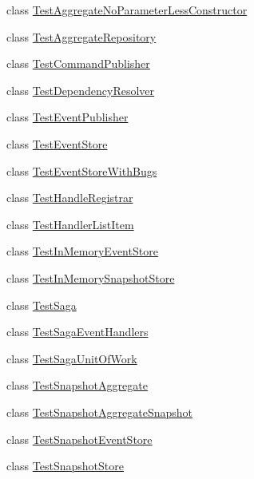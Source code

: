 \begin{DoxyCompactItemize}
class \hyperlink{classCqrs_1_1Tests_1_1Substitutes_1_1TestAggregateNoParameterLessConstructor}{Test\+Aggregate\+No\+Parameter\+Less\+Constructor}
\item 
class \hyperlink{classCqrs_1_1Tests_1_1Substitutes_1_1TestAggregateRepository}{Test\+Aggregate\+Repository}
\item 
class \hyperlink{classCqrs_1_1Tests_1_1Substitutes_1_1TestCommandPublisher}{Test\+Command\+Publisher}
\item 
class \hyperlink{classCqrs_1_1Tests_1_1Substitutes_1_1TestDependencyResolver}{Test\+Dependency\+Resolver}
\item 
class \hyperlink{classCqrs_1_1Tests_1_1Substitutes_1_1TestEventPublisher}{Test\+Event\+Publisher}
\item 
class \hyperlink{classCqrs_1_1Tests_1_1Substitutes_1_1TestEventStore}{Test\+Event\+Store}
\item 
class \hyperlink{classCqrs_1_1Tests_1_1Substitutes_1_1TestEventStoreWithBugs}{Test\+Event\+Store\+With\+Bugs}
\item 
class \hyperlink{classCqrs_1_1Tests_1_1Substitutes_1_1TestHandleRegistrar}{Test\+Handle\+Registrar}
\item 
class \hyperlink{classCqrs_1_1Tests_1_1Substitutes_1_1TestHandlerListItem}{Test\+Handler\+List\+Item}
\item 
class \hyperlink{classCqrs_1_1Tests_1_1Substitutes_1_1TestInMemoryEventStore}{Test\+In\+Memory\+Event\+Store}
\item 
class \hyperlink{classCqrs_1_1Tests_1_1Substitutes_1_1TestInMemorySnapshotStore}{Test\+In\+Memory\+Snapshot\+Store}
\item 
class \hyperlink{classCqrs_1_1Tests_1_1Substitutes_1_1TestSaga}{Test\+Saga}
\item 
class \hyperlink{classCqrs_1_1Tests_1_1Substitutes_1_1TestSagaEventHandlers}{Test\+Saga\+Event\+Handlers}
\item 
class \hyperlink{classCqrs_1_1Tests_1_1Substitutes_1_1TestSagaUnitOfWork}{Test\+Saga\+Unit\+Of\+Work}
\item 
class \hyperlink{classCqrs_1_1Tests_1_1Substitutes_1_1TestSnapshotAggregate}{Test\+Snapshot\+Aggregate}
\item 
class \hyperlink{classCqrs_1_1Tests_1_1Substitutes_1_1TestSnapshotAggregateSnapshot}{Test\+Snapshot\+Aggregate\+Snapshot}
\item 
class \hyperlink{classCqrs_1_1Tests_1_1Substitutes_1_1TestSnapshotEventStore}{Test\+Snapshot\+Event\+Store}
\item 
class \hyperlink{classCqrs_1_1Tests_1_1Substitutes_1_1TestSnapshotStore}{Test\+Snapshot\+Store}
\end{DoxyCompactItemize}
